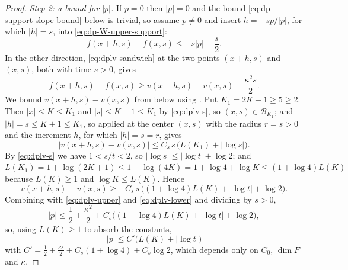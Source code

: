 \begin{proof}
\emph{Step 2: a bound for $|p|$.}
If $p=0$ then $|p|=0$ and the bound \eqref{eq:dp-support-slope-bound} below is
trivial, so assume $p\ne0$ and insert $h=-sp/|p|$, for which $|h|=s$, into
\eqref{eq:dp-W-upper-support}:
\begin{equation}\label{eq:dplv-upper}
  f(x+h,s)-f(x,s)\le-s|p|+\frac s2 .
\end{equation}
In the other direction, \eqref{eq:dplv-sandwich} at the two points $(x+h,s)$ and
$(x,s)$, both with time $s>0$, gives
\begin{equation}\label{eq:dplv-lower}
  f(x+h,s)-f(x,s)\ge v(x+h,s)-v(x,s)-\frac{\kappa^2s}{2}.
\end{equation}
We bound $v(x+h,s)-v(x,s)$ from below using . Put
$K_1=2K+1\ge5\ge2$. Then $|x|\le K\le K_1$ and $|s|\le K+1\le K_1$ by
\eqref{eq:dplv-s}, so $(x,s)\in\mathcal B_{K_1}$; and $|h|=s\le K+1\le K_1$, so
 applied at the center $(x,s)$ with the radius
$r=s>0$ and the increment $h$, for which $|h|=s=r$, gives
\[
  |v(x+h,s)-v(x,s)|\le C_s\,s\,\bigl(L(K_1)+|\log s|\bigr).
\]
By \eqref{eq:dplv-s} we have $1<s/t<2$, so
$|\log s|\le|\log t|+\log2$; and
$L(K_1)=1+\log(2K+1)\le1+\log(4K)=1+\log4+\log K\le(1+\log4)L(K)$ because
$L(K)\ge1$ and $\log K\le L(K)$. Hence
\[
  v(x+h,s)-v(x,s)\ge-C_s\,s\,\bigl((1+\log4)L(K)+|\log t|+\log2\bigr).
\]
Combining with \eqref{eq:dplv-upper} and \eqref{eq:dplv-lower} and dividing by
$s>0$,
\[
  |p|\le\frac12+\frac{\kappa^2}{2}
    +C_s\bigl((1+\log4)L(K)+|\log t|+\log2\bigr),
\]
so, using $L(K)\ge1$ to absorb the constants,
\begin{equation}\label{eq:dp-support-slope-bound}
  |p|\le C'\bigl(L(K)+|\log t|\bigr)
\end{equation}
with $C'=\tfrac12+\tfrac{\kappa^2}{2}+C_s(1+\log4)+C_s\log2$, which depends only
on $C_0$, $\dim F$ and $\kappa$.


\end{proof}
